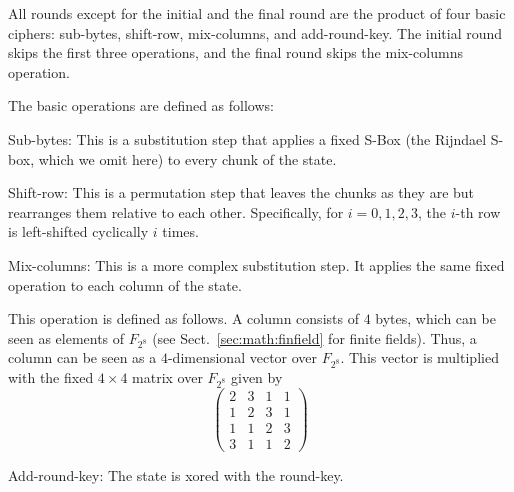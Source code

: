 All rounds except for the initial and the final round are the product of four basic ciphers: sub-bytes, shift-row, mix-columns, and add-round-key.
The initial round skips the first three operations, and the final round skips the mix-columns operation.

The basic operations are defined as follows:
\begin{compactenum}
  \item Sub-bytes: This is a substitution step that applies a fixed S-Box (the Rijndael S-box, which we omit here) to every chunk of the state.
  \item Shift-row: This is a permutation step that leaves the chunks as they are but rearranges them relative to each other.
    Specifically, for $i=0,1,2,3$, the $i$-th row is left-shifted cyclically $i$ times.
  \item Mix-columns: This is a more complex substitution step.
    It applies the same fixed operation to each column of the state.
    
    This operation is defined as follows.
    A column consists of $4$ bytes, which can be seen as elements of $F_{2^8}$ (see Sect.~\ref{sec:math:finfield} for finite fields).
    Thus, a column can be seen as a $4$-dimensional vector over $F_{2^8}$.
    This vector is multiplied with the fixed $4\times 4$ matrix over $F_{2^8}$ given by
    \[\left(\begin{matrix}
    2&3&1&1\\1&2&3&1\\1&1&2&3\\3&1&1&2
   \end{matrix}\right)\]
  \item Add-round-key: The state is xored with the round-key.   
\end{compactenum}
